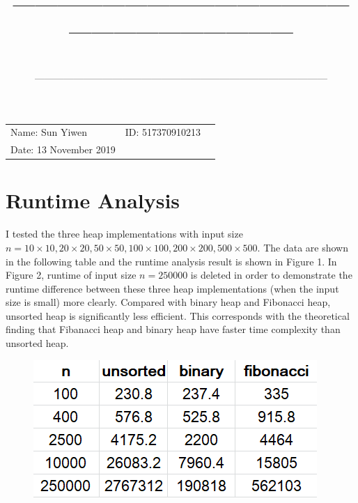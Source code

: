 \documentclass[a4paper]{article}
\title{—————————————————————————\\ \sc{UM-SJTU Joint Institute}}
\author{\sc{Data Structures and Algorithms}}
\date{\sc{(Ve281)}\\——————————————————————————————}
\begin{document}
\maketitle
\vspace{5cm}
\centerline{\Large{}}
\vspace{9cm}
\begin{tabular}{lll}
\qquad \qquad Name: Sun Yiwen&ID: 517370910213\\
\qquad \qquad Date: 13 November 2019
\end{tabular}

\newpage
\section{Runtime Analysis}
\noindent
\par
I tested the three heap implementations with input size $n=10\times10,20\times20,50\times50,100\times100,200\times200,500\times500$. The data are shown in the following table and the runtime analysis result is shown in Figure 1. In Figure 2, runtime of input size $n=250000$ is deleted in order to demonstrate the runtime difference between these three heap implementations (when the input size is small) more clearly. Compared with binary heap and Fibonacci heap, unsorted heap is significantly less efficient. This corresponds with the theoretical finding that Fibanacci heap and binary heap have faster time complexity than unsorted heap.

\begin{figure}[htbp]
\centering
\includegraphics[scale=0.7]{p3new.png}
\end{figure}
\end{document}
